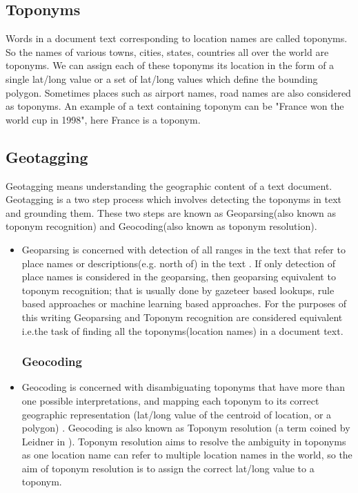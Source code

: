 \documentclass[
     11pt,         %
     a4paper,      %
     oneside,
     ]{article}
\begin{document}
\subsection{Toponyms} Words in a document text corresponding to location names are called toponyms. So the names of various towns, cities, states, countries all over the world are toponyms. We can assign each of these toponyms its location in the form of a single lat/long value or a set of lat/long values which define the bounding polygon. Sometimes places such as airport names, road names are also considered as toponyms. An example of a text containing toponym can be "France won the world cup in 1998", here France is a toponym. 
\subsection{Geotagging} Geotagging means understanding the geographic content of a text document. Geotagging is a two step process which involves detecting the toponyms in text and grounding them. These two steps are known as Geoparsing(also known as toponym recognition) and Geocoding(also known as toponym resolution). 

\begin{itemize}
	\subsubsection{Geoparsing} 
	\item[] Geoparsing is concerned with detection of all ranges in the text that refer to place names or descriptions(e.g. north of) in the text \cite{Leidner:2011:DGR:2047296.2047298}. If only detection of place names is considered in the geoparsing, then geoparsing equivalent to toponym recognition; that is usually done by gazeteer based lookups, rule based approaches or machine learning based approaches. For the purposes of this writing Geoparsing and Toponym recognition are considered equivalent i.e.the task of finding all the toponyms(location names) in a document text.
	\subsubsection{Geocoding} 
	\item[] Geocoding is concerned with disambiguating toponyms that have more than one possible interpretations, and mapping each toponym to its correct geographic representation (lat/long value of the centroid of location, or a polygon) \cite{Leidner:2011:DGR:2047296.2047298}. Geocoding is also known as Toponym resolution (a term coined by Leidner in \cite{Leidner:2008:PhD}). Toponym resolution aims to resolve the ambiguity in toponyms as one location name can refer to multiple location names in the world, so the aim of toponym resolution is to assign the correct lat/long value to a toponym.
\end{itemize}
\end{document}
